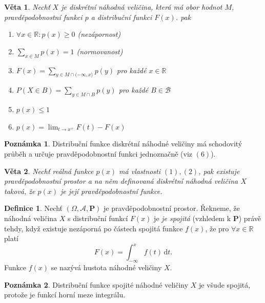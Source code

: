 \documentclass[a4]{report}
\newtheorem{theorem}{Věta}
\theoremstyle{definition}
\newtheorem{definition}{Definice}[section]
\newtheorem{notes}{Poznámka}[section]
\begin{document}
{\begin{theorem}
Nechť $X$ je diskrétní náhodná veličina, která má obor hodnot $M$, pravděpodobnostní funkci $p$ a distribuční funkci $F(x)$. pak
\begin{enumerate}
\item $\forall x \in \mathbb{R}: p(x)\geq 0$ (nezápornost)
\item $\sum_{x\in M} p(x) =1$ (normovanost)
\item $F(x)=\sum_{y\in M \cap (-\infty,x\rangle } p(y) $ pro každé $x \in \mathbb{R}$
\item $P(X\in B)=\sum_{y\in M \cap B } p(y) $ pro každé $B \in \mathcal{B}$
\item $p(x) \leq 1$
\item $p(x)= \lim_{t\rightarrow x^+ }F(t)-F(x)$

\end{enumerate}
\end{theorem}

\begin{notes}
Distribuční funkce diskrétní náhodné veličiny má schodovitý průběh a určuje pravděpodobnostní funkci jednoznačně (viz $(6)$).
\end{notes}

\begin{theorem}
Nechť reálná funkce $p(x)$ má vlastnosti $(1),(2)$, pak existuje pravděpodobnostní prostor a na něm definovaná diskrétní náhodná veličina $X$ taková, že $p(x)$ je její pravděpodobnostní funkce.
\end{theorem}


\begin{definition}
Nechť $(\Omega,\mathcal{A},\textbf{P})$ je pravděpodobnostní prostor. Řekneme, že náhodná veličina $X$ s distribuční funkcí $F(x)$ je \textit{je spojitá} (vzhledem k $\textbf{P}$) právě tehdy, když existuje nezáporná po částech spojitá funkce $f(x)$, že pro $\forall x \in \mathbb{R}$ platí 
\begin{equation}
F(x)=\int_{-\infty}^x f(t)\, \mathrm{d} t.
\end{equation}
Funkce $f(x)$ se nazývá hustota náhodné veličiny $X$.
\end{definition}

\begin{notes}
Distribuční funkce spojité náhodné veličiny $X$ je všude spojitá, protože je funkcí horní meze integrálu.
\end{notes}

}
\end{document}
